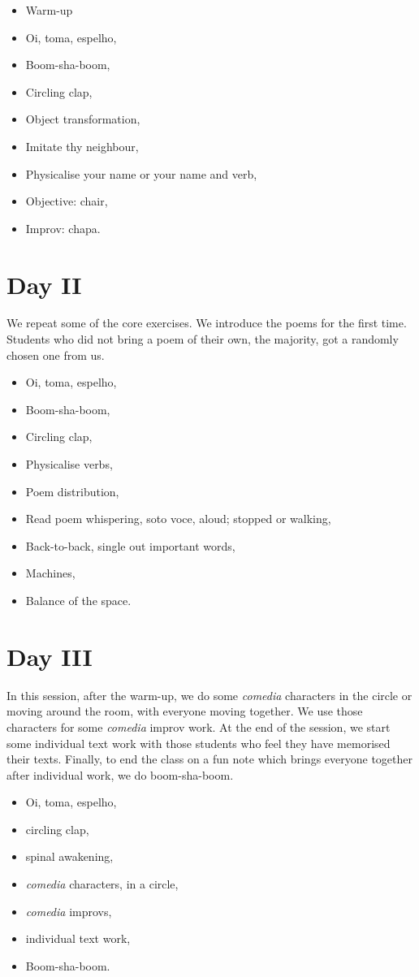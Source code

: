 \documentclass[article,twocolumn,twoside]{memoir}
\begin{document}
\begin{itemize}
\item Warm-up
\item Oi, toma, espelho,
\item Boom-sha-boom,
\item Circling clap,
\item Object transformation,
\item Imitate thy neighbour,
\item Physicalise your name or your name and verb,
\item Objective: chair,
\item Improv: chapa.
\end{itemize}
\section{Day II}

We repeat some of the core exercises. We introduce the poems for the first
time. Students who did not bring a poem of their own, the majority, got a
randomly chosen one from us.

\begin{itemize}
\item Oi, toma, espelho,
\item Boom-sha-boom,
\item Circling clap,
\item Physicalise verbs,
\item Poem distribution,
\item Read poem whispering, soto voce, aloud; stopped or walking,
\item Back-to-back, single out important words,
\item Machines,
\item Balance of the space.
\end{itemize}
\section{Day III}
In this session, after the warm-up, we do some \textit{comedia} characters in
the circle or moving around the room, with everyone moving together. We use
those characters for some \textit{comedia} improv work. At the end of the
session, we start some individual text work with those students who feel they
have memorised their texts. Finally, to end the class on a fun note which
brings everyone together after individual work, we do boom-sha-boom.

\begin{itemize}
\item Oi, toma, espelho,
\item circling clap,
\item spinal awakening,
\item \textit{comedia} characters, in a circle,
\item \textit{comedia} improvs,
\item individual text work,
\item Boom-sha-boom.
\end{itemize}
\end{document}
